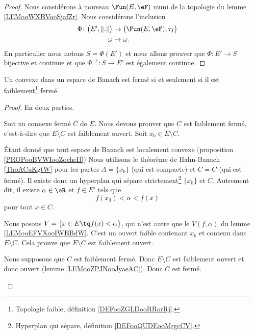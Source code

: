 \begin{proof}
	Nous considérons à nouveau \( \Fun(E, \eF)\) muni de la topologie du lemme \ref{LEMooWXBVooSjafZr}. Nous considérons l'inclusion
	\begin{equation}
		\begin{aligned}
			\Phi\colon \big( E',\| . \| \big) & \to \big( \Fun(E,\eF), \tau_I \big) \\
			\omega                            & \mapsto \omega.
		\end{aligned}
	\end{equation}
	En particulier nous notons \( S=\Phi(E')\) et nous allons prouver que \( \Phi\colon E'\to S\) bijective et continue et que \( \Phi^{-1}\colon S\to E'\) est également continue.
\end{proof}


\begin{proposition}       \label{PROPooYARHooOpmztY}
	Un convexe dans un espace de Banach est fermé si et seulement si il est faiblement\footnote{Topologie faible, définition \ref{DEFooZGLDooRRarRj}.} fermé.
\end{proposition}

\begin{proof}
	En deux parties.
	\begin{subproof}
		\spitem[\( \Rightarrow\)]
		Soit un connexe fermé \( C\) de \( E\). Nous devons prouver que \( C\) est faiblement fermé, c'est-à-dire que \( E\setminus C\) est faiblement ouvert. Soit \( x_0\in E\setminus C\).

		Étant donné que tout espace de Banach est localement convexe (proposition \ref{PROPooBVWIooZocheH}) Nous utilisons le théorème de Hahn-Banach \ref{ThoACuKgtW} pour les partes \( A=\{ x_0 \}\) (qui est compacte) et \( C=C\) (qui est fermé). Il existe donc un hyperplan qui sépare strictement\footnote{Hyperplan qui sépare, définition \ref{DEFooQUDEooMrgcCV}.} \( \{ x_0 \}\) et \( C\). Autrement dit, il existe \( \alpha\in \eR\) et \( f\in E'\) tels que
		\begin{equation}
			f(x_0)<\alpha<f(x)
		\end{equation}
		pour tout \( x\in C\).

		Nous posons \( V=\{ x\in E\tq f(x)<\alpha \}\), qui n'est autre que le \( V(f,\alpha)\) du lemme \ref{LEMooEFVXooIWBBdW}. C'est un ouvert faible contenant \( x_0\) et contenu dans \( E\setminus C\). Cela prouve que \( E\setminus C\) est faiblement ouvert.

		\spitem[\( \Leftarrow\)]
		Nous supposons que \( C\) est faiblement fermé. Donc \( E\setminus C\) est faiblement ouvert et donc ouvert (lemme \ref{LEMooZPJNooJyaeAC}). Donc \( C\) est fermé.
	\end{subproof}
\end{proof}

